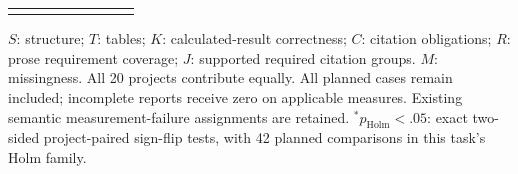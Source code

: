 \begin{table}[t]
\begin{tabular}{llrrrrrrr}
\addlinespace[2pt]
\bottomrule
\end{tabular}
\par\vspace{3pt}
\begin{minipage}{0.98\linewidth}\footnotesize
$S$: structure; $T$: tables; $K$: calculated-result correctness; $C$: citation obligations; $R$: prose requirement coverage; $J$: supported required citation groups. $M$: missingness. All 20 projects contribute equally. All planned cases remain included; incomplete reports receive zero on applicable measures. Existing semantic measurement-failure assignments are retained. $^{*}p_{\mathrm{Holm}}<.05$: exact two-sided project-paired sign-flip tests, with 42 planned comparisons in this task's Holm family.
\end{minipage}
\end{table}
